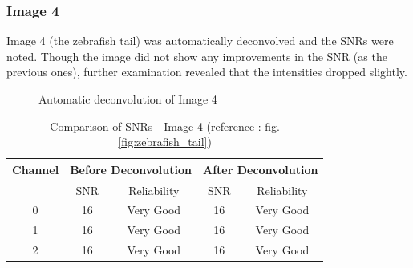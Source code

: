 \documentclass{article}
\begin{document}
\subsubsection*{Image 4}
Image 4 (the zebrafish tail) was automatically deconvolved and the SNRs were noted. Though the image did not show any improvements in the SNR (as the previous ones), further examination revealed that the intensities dropped slightly. 
\begin{figure}[h!]
\centering
{}
\vspace{5 mm}
\caption{Automatic deconvolution of Image 4}
\label{fig:auto-deconvolve-image4}
\end{figure}
\begin{table}[h!]
\centering
\caption{Comparison of SNRs - Image 4 (reference : fig. \ref{fig:zebrafish_tail})}
\begin{tabular}{*5c}
\toprule
Channel &  \multicolumn{2}{c}{Before Deconvolution} & \multicolumn{2}{c}{After Deconvolution}\\
\midrule
{}   & SNR   & Reliability    & SNR   & Reliability \\
0   &  16 & Very Good & 16 & Very Good \\
1   &  16 & Very Good & 16 & Very Good \\
2   &  16 & Very Good & 16 & Very Good \\
\bottomrule
\end{tabular}
\end{table}
\clearpage
\end{document}
